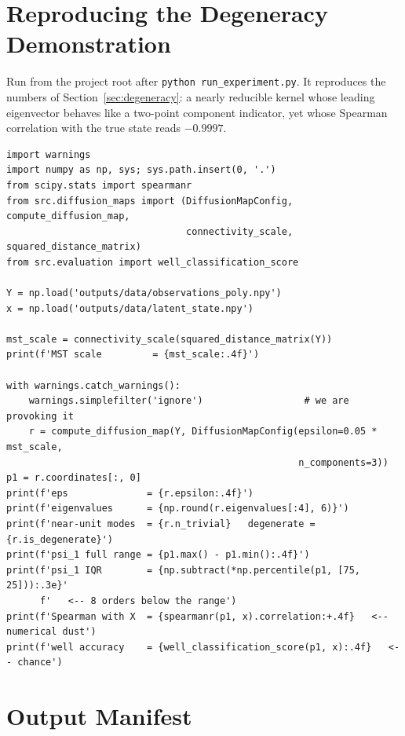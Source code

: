 \documentclass[11pt]{article}
\begin{document}
\section{Reproducing the Degeneracy Demonstration}
\label{app:degeneracy}

Run from the project root after \texttt{python run\_experiment.py}. It reproduces
the numbers of Section~\ref{sec:degeneracy}: a nearly reducible kernel whose
leading eigenvector behaves like a two-point component indicator, yet whose
Spearman correlation with the true state reads $-0.9997$.

\begin{small}
\begin{verbatim}
import warnings
import numpy as np, sys; sys.path.insert(0, '.')
from scipy.stats import spearmanr
from src.diffusion_maps import (DiffusionMapConfig, compute_diffusion_map,
                                connectivity_scale, squared_distance_matrix)
from src.evaluation import well_classification_score

Y = np.load('outputs/data/observations_poly.npy')
x = np.load('outputs/data/latent_state.npy')

mst_scale = connectivity_scale(squared_distance_matrix(Y))
print(f'MST scale         = {mst_scale:.4f}')

with warnings.catch_warnings():
    warnings.simplefilter('ignore')                  # we are provoking it
    r = compute_diffusion_map(Y, DiffusionMapConfig(epsilon=0.05 * mst_scale,
                                                    n_components=3))
p1 = r.coordinates[:, 0]
print(f'eps              = {r.epsilon:.4f}')
print(f'eigenvalues      = {np.round(r.eigenvalues[:4], 6)}')
print(f'near-unit modes  = {r.n_trivial}   degenerate = {r.is_degenerate}')
print(f'psi_1 full range = {p1.max() - p1.min():.4f}')
print(f'psi_1 IQR        = {np.subtract(*np.percentile(p1, [75, 25])):.3e}'
      f'   <-- 8 orders below the range')
print(f'Spearman with X  = {spearmanr(p1, x).correlation:+.4f}   <-- numerical dust')
print(f'well accuracy    = {well_classification_score(p1, x):.4f}   <-- chance')
\end{verbatim}
\end{small}

\section{Output Manifest}
\label{app:manifest}
\end{document}
